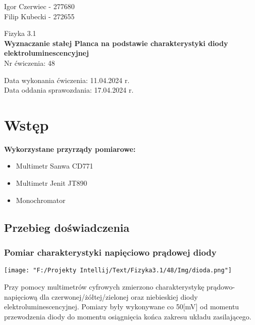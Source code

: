 \documentclass[11pt]{article}
\begin{document}
    \begin{flushright}
        \large{
            Igor Czerwiec - 277680\\
            Filip Kubecki - 272655
        }\\
    \end{flushright}
    \begin{center}
        \large{Fizyka 3.1}\\
        \vspace{2mm}
        \LARGE{\textbf{Wyznaczanie stałej Planca na podstawie charakterystyki diody elektroluminescencyjnej}}\\
        \vspace{3mm}
        \huge{Nr ćwiczenia: 48}\\
        \vspace{1cm}
    \end{center}
    \begin{flushright}
        \large{
            Data wykonania ćwiczenia: 11.04.2024 r.\\
            Data oddania sprawozdania: 17.04.2024 r.
        }\\
    \end{flushright}
    \vspace{1cm}
    \section{Wstęp}
    \textbf{Wykorzystane przyrządy pomiarowe:}
    \begin{itemize}
        \itemsep0em
        \item Multimetr Sanwa CD771
        \item Multimetr Jenit JT890
        \item Monochromator
    \end{itemize}
    \subsection*{Przebieg doświadczenia}
    \subsubsection*{Pomiar charakterystyki napięciowo prądowej diody}
    \begin{center}
        \texttt{[image: "F:/Projekty Intellij/Text/Fizyka3.1/48/Img/dioda.png"]}
    \end{center}
    Przy pomocy multimetrów cyfrowych zmierzono charakterystykę prądowo-napięciową
    dla czerwonej/żółtej/zielonej oraz niebieskiej diody elektroluminescencyjnej. Pomiary były wykonywane co
    50[mV] od momentu przewodzenia diody do momentu osiągnięcia końca zakresu układu zasilającego.
\end{document}
